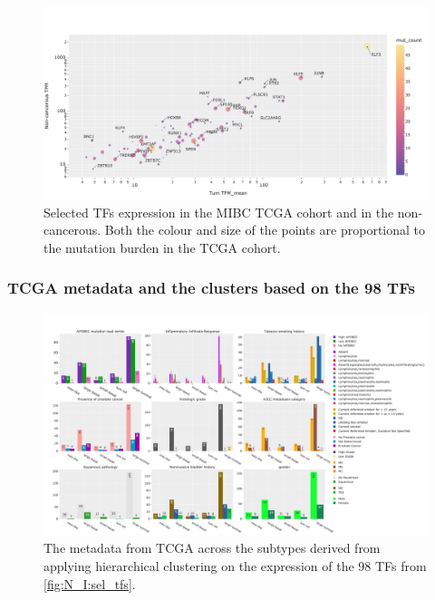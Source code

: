 \begin{figure}[H]   
\centering
\includegraphics[width=1.0\textwidth,height=1.0\textheight,keepaspectratio]{Sections/Network_I/Resources/selective_pruning/sel_tfs_mean_tum_healthy.png}
  \caption{Selected TFs expression in the MIBC TCGA cohort and in the non-cancerous. Both the colour and size of the points are proportional to the mutation burden in the TCGA cohort.}
\label{fig:ap:sel_tfs_mean}
\end{figure}

\subsubsection{TCGA metadata and the clusters based on the 98 TFs} 

\label{s:ap:sel_prun_tcga_meta}

\begin{figure}[!htb]   
\centering
\includegraphics[width=1.0\textwidth,height=1.0\textheight,keepaspectratio]{Sections/Network_I/Resources/selective_pruning/sel_tfs_tcga_meta.png}
  \caption{The metadata from TCGA \cite{Robertson2017-mg} across the subtypes derived from applying hierarchical clustering on the expression of the 98 TFs from \cref{fig:N_I:sel_tfs}. }
\label{fig:ap:sel_tfs_tcga_metadata}
\end{figure}

